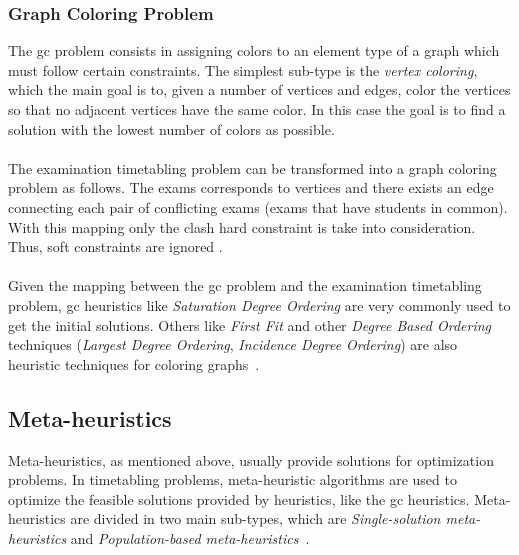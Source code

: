 \subsubsection{Graph Coloring Problem}
The \gls{gc} problem consists in assigning colors to an element type of a graph which must follow certain constraints. The simplest sub-type is the \textit{vertex coloring}, which the main goal is to, given a number of vertices and edges, color the vertices so that no adjacent vertices have the same color. In this case the goal is to find a solution with the lowest number of colors as possible.\\
\\
The examination timetabling problem can be transformed into a graph coloring problem as follows. The exams corresponds to vertices and there exists an edge connecting each pair of conflicting exams (exams that have students in common). With this mapping only the clash hard constraint is take into consideration. Thus, soft constraints are ignored \cite{Qu2009}.\\
\\
Given the mapping between the \gls{gc} problem and the examination timetabling problem, \gls{gc} heuristics like \textit{Saturation Degree Ordering} are very commonly used to get the initial solutions. Others like \textit{First Fit} and other \textit{Degree Based Ordering} techniques (\textit{Largest Degree Ordering}, \textit{Incidence Degree Ordering}) are also heuristic techniques for coloring graphs~\cite{Carter1996}.\\


\subsection{Meta-heuristics}
Meta-heuristics, as mentioned above, usually provide solutions for optimization problems. In timetabling problems, meta-heuristic algorithms are used to optimize the feasible solutions provided by heuristics, like the \gls{gc} heuristics. Meta-heuristics are divided in two main sub-types, which are \textit{Single-solution meta-heuristics} and \textit{Population-based meta-heuristics}~\cite{Talbi2009}.\\

